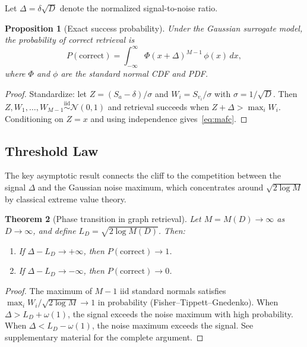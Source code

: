 \documentclass[11pt]{article}
\newtheorem{theorem}{Theorem}
\newtheorem{proposition}[theorem]{Proposition}
\begin{document}
Let $\Delta = \delta\sqrt{D}$ denote the normalized signal-to-noise ratio.

\begin{proposition}[Exact success probability]\label{prop:exact}
Under the Gaussian surrogate model, the probability of correct retrieval is
\begin{equation}\label{eq:mafc}
P(\text{correct}) = \int_{-\infty}^{\infty} \Phi(x + \Delta)^{M-1} \, \phi(x) \, dx,
\end{equation}
where $\Phi$ and $\phi$ are the standard normal CDF and PDF.
\end{proposition}

\begin{proof}
Standardize: let $Z = (S_a - \delta)/\sigma$ and $W_i = S_{v_i}/\sigma$ with $\sigma = 1/\sqrt{D}$. Then $Z, W_1, \ldots, W_{M-1} \stackrel{\text{iid}}{\sim} \mathcal{N}(0,1)$ and retrieval succeeds when $Z + \Delta > \max_i W_i$. Conditioning on $Z = x$ and using independence gives~\eqref{eq:mafc}.
\end{proof}

\subsection{Threshold Law}

The key asymptotic result connects the cliff to the competition between the signal $\Delta$ and the Gaussian noise maximum, which concentrates around $\sqrt{2 \log M}$ by classical extreme value theory.

\begin{theorem}[Phase transition in graph retrieval]\label{thm:main}
Let $M = M(D) \to \infty$ as $D \to \infty$, and define $L_D = \sqrt{2 \log M(D)}$. Then:
\begin{enumerate}
    \item If $\Delta - L_D \to +\infty$, then $P(\text{correct}) \to 1$.
    \item If $\Delta - L_D \to -\infty$, then $P(\text{correct}) \to 0$.
\end{enumerate}
\end{theorem}

\begin{proof}
The maximum of $M - 1$ iid standard normals satisfies $\max_i W_i / \sqrt{2 \log M} \to 1$ in probability (Fisher--Tippett--Gnedenko). When $\Delta > L_D + \omega(1)$, the signal exceeds the noise maximum with high probability. When $\Delta < L_D - \omega(1)$, the noise maximum exceeds the signal. See supplementary material for the complete argument.
\end{proof}
\end{document}
